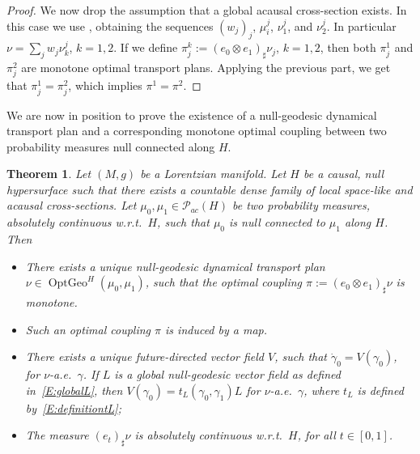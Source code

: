 \documentclass[12pt,a4paper]{amsart}
\theoremstyle{plain}
\newtheorem{theorem}[lemma]{Theorem}
\theoremstyle{definition}
\numberwithin{equation}{section}
\DeclareMathOperator{\OptGeo}{OptGeo}
\newcommand{\Prob}{\mathcal P}
\begin{document}
\begin{proof}
  We now drop the assumption that a global acausal cross-section
  exists.
  In this case we use , obtaining
  the sequences $(w_j)_j$, $\mu_i^j$, $\nu^j_1$, and $\nu^j_2$.
  In particular $\nu=\sum_{j} w_j \nu_k^j$, $k=1,2$.
  If we define $\pi^k_j:=(e_0\otimes e_1)_{\sharp} \nu_j$, $k=1,2$, then
  both $\pi^1_j$ and $\pi^2_j$ are monotone optimal transport plans. Applying the previous part, we get that
  $\pi^1_j=\pi^2_j$, which implies $\pi^1=\pi^2$.
\end{proof}




We are now in position to prove the existence of a null-geodesic
dynamical transport plan and a corresponding monotone optimal coupling  between two probability measures null connected along $H$.







\begin{theorem}
  \label{T:good-representation2}
Let $(M,g)$ be a Lorentzian manifold.
  Let $H$ be a causal, null hypersurface such that there exists a countable
  dense family of local space-like and acausal cross-sections. 
  Let $\mu_0,\mu_1\in \Prob_{ac}(H)$ be two probability measures,
  absolutely continuous w.r.t.\ $H$, such that
  $\mu_0$ is null connected to $\mu_1$ along $H$.  Then 
  \begin{itemize}
 \item   There exists a unique null-geodesic dynamical transport plan
  $\nu\in\OptGeo^H(\mu_0,\mu_1)$, such that the optimal coupling $\pi:=(e_0\otimes e_1)_{\sharp}\nu$ is monotone.  
  \item Such an optimal coupling $\pi$ is induced by a map.
  \item There exists a unique future-directed vector field
  $V$, such that $\dot\gamma_0 = V(\gamma_0)$,
  for $\nu$-a.e.\ $\gamma$.  If $L$ is a global null-geodesic vector field as defined in~\eqref{E:globalL}, then
  $V(\gamma_0)=t_L(\gamma_0,\gamma_1)L$ for $\nu$-a.e.\ $\gamma$, where $t_{L}$ is defined by~\eqref{E:definitiontL};
  \item The measure $(e_t)_{\sharp}\nu$ is absolutely continuous
  w.r.t.\ $H$, for all $t\in [0,1]$.
  \end{itemize}
\end{theorem}
\end{document}
